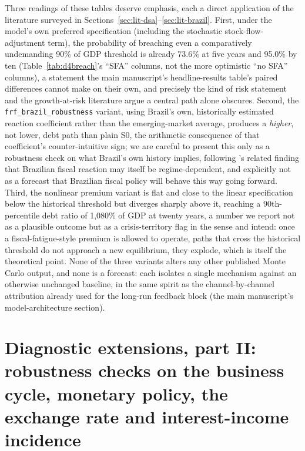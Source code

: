 \documentclass[11pt,a4paper]{article}
\begin{document}
Three readings of these tables deserve emphasis, each a direct application of the literature surveyed in Sections~\ref{sec:lit-dsa}--\ref{sec:lit-brazil}. First, under the model's own preferred specification (including the stochastic stock-flow-adjustment term), the probability of breaching even a comparatively undemanding 90\% of GDP threshold is already 73.6\% at five years and 95.0\% by ten (Table~\ref{tab:d4breach}'s ``SFA'' columns, not the more optimistic ``no SFA'' columns), a statement the main manuscript's headline-results table's paired differences cannot make on their own, and precisely the kind of risk statement \citet{garciarigobon2004} and the growth-at-risk literature \citep{prasadetal2019growthatrisk,lianpresbiterowiriadinata2020,furcerietal2025debtrisk} argue a central path alone obscures. Second, the \texttt{frf\_brazil\_robustness} variant, using Brazil's own, historically estimated reaction coefficient rather than the emerging-market average, produces a \emph{higher}, not lower, debt path than plain \textsc{S0}, the arithmetic consequence of that coefficient's counter-intuitive sign; we are careful to present this only as a robustness check on what Brazil's own history implies, following \citet{simonassilima2005}'s related finding that Brazilian fiscal reaction may itself be regime-dependent, and explicitly not as a forecast that Brazilian fiscal policy will behave this way going forward. Third, the nonlinear premium variant is flat and close to the linear specification below the historical threshold but diverges sharply above it, reaching a 90th-percentile debt ratio of 1,080\% of GDP at twenty years, a number we report not as a plausible outcome but as a crisis-territory flag in the sense \citet{ghoshkimmendozaostryqureshi2013} and \citet{bi2012} intend: once a fiscal-fatigue-style premium is allowed to operate, paths that cross the historical threshold do not approach a new equilibrium, they explode, which is itself the theoretical point. None of the three variants alters any other published Monte Carlo output, and none is a forecast: each isolates a single mechanism against an otherwise unchanged baseline, in the same spirit as the channel-by-channel attribution already used for the long-run feedback block (the main manuscript's model-architecture section).

\section{Diagnostic extensions, part II: robustness checks on the business cycle, monetary policy, the exchange rate and interest-income incidence}
\label{app:reviewer}
\end{document}

